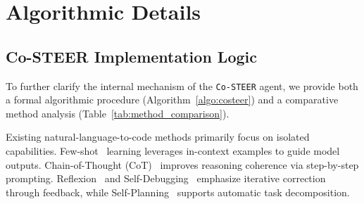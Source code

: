 \documentclass{article}
\begin{document}
\newpage












\appendix
\newpage

\section{Algorithmic Details}
\subsection{Co-STEER Implementation Logic} \label{app:alg-cos}
To further clarify the internal mechanism of the \texttt{Co-STEER} agent, we provide both a formal algorithmic procedure (Algorithm~\ref{algo:costeer}) and a comparative method analysis (Table~\ref{tab:method_comparison}).

Existing natural-language-to-code methods primarily focus on isolated capabilities. Few-shot~\cite{brown2020lanugage} learning leverages in-context examples to guide model outputs. Chain-of-Thought (CoT)~\cite{wei2022chain} improves reasoning coherence via step-by-step prompting. Reflexion~\cite{shinn2023reflexion} and Self-Debugging~\cite{jiang2023self} emphasize iterative correction through feedback, while Self-Planning~\cite{chen2024teaching} supports automatic task decomposition.
\end{document}
